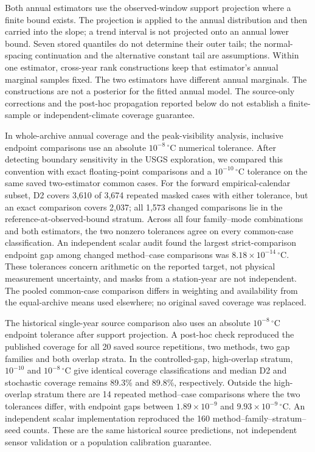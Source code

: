 \documentclass[draft,wrr]{agutexSI2019}
\begin{document}
\begin{article}
Both annual estimators use the observed-window support projection where a finite bound exists. The projection is applied to the annual distribution and then carried into the slope; a trend interval is not projected onto an annual lower bound. Seven stored quantiles do not determine their outer tails; the normal-spacing continuation and the alternative constant tail are assumptions. Within one estimator, cross-year rank constructions keep that estimator's annual marginal samples fixed. The two estimators have different annual marginals. The constructions are not a posterior for the fitted annual model. The source-only corrections and the post-hoc propagation reported below do not establish a finite-sample or independent-climate coverage guarantee.

In whole-archive annual coverage and the peak-visibility analysis, inclusive endpoint comparisons use an absolute $10^{-8}\,^{\circ}$C numerical tolerance. After detecting boundary sensitivity in the USGS exploration, we compared this convention with exact floating-point comparisons and a $10^{-10}\,^{\circ}$C tolerance on the same saved two-estimator common cases. For the forward empirical-calendar subset, D2 covers 3,610 of 3,674 repeated masked cases with either tolerance, but an exact comparison covers 2,037; all 1,573 changed comparisons lie in the reference-at-observed-bound stratum. Across all four family--mode combinations and both estimators, the two nonzero tolerances agree on every common-case classification. An independent scalar audit found the largest strict-comparison endpoint gap among changed method--case comparisons was $8.18\times10^{-14}\,^{\circ}$C. These tolerances concern arithmetic on the reported target, not physical measurement uncertainty, and masks from a station-year are not independent. The pooled common-case comparison differs in weighting and availability from the equal-archive means used elsewhere; no original saved coverage was replaced.

The historical single-year source comparison also uses an absolute $10^{-8}\,^{\circ}$C endpoint tolerance after support projection. A post-hoc check reproduced the published coverage for all 20 saved source repetitions, two methods, two gap families and both overlap strata. In the controlled-gap, high-overlap stratum, $10^{-10}$ and $10^{-8}\,^{\circ}$C give identical coverage classifications and median D2 and stochastic coverage remains 89.3\% and 89.8\%, respectively. Outside the high-overlap stratum there are 14 repeated method--case comparisons where the two tolerances differ, with endpoint gaps between $1.89\times10^{-9}$ and $9.93\times10^{-9}\,^{\circ}$C. An independent scalar implementation reproduced the 160 method--family--stratum--seed counts. These are the same historical source predictions, not independent sensor validation or a population calibration guarantee.


\end{article}
\end{document}
